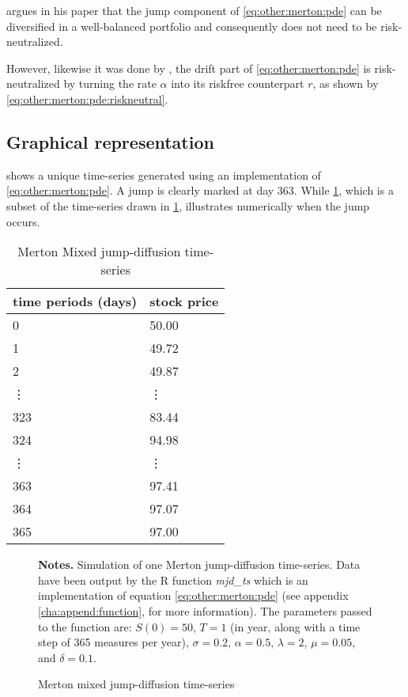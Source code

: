 \documentclass[12pt,a4paper]{report}
\begin{document}
\citet{merton76} argues in his paper that the jump component of \cref{eq:other:merton:pde} can be diversified in a well-balanced portfolio and consequently does not need to be risk-neutralized.

However, likewise it was done by \citet{bs}, the drift part of \cref{eq:other:merton:pde} is risk-neutralized by turning the rate $\alpha$ into its riskfree counterpart $r$, as shown by \cref{eq:other:merton:pde:riskneutral}.



\subsection{Graphical representation}
\label{sub:other:merton:graphical}   

 shows a unique time-series generated using an implementation of \cref{eq:other:merton:pde}. A jump is clearly marked at day 363. While
\cref{t:other:merton:path}, which is a subset of the time-series drawn in \cref{p:other:merton:path}, illustrates numerically when the jump occurs.

\begin{table}[ht]
\centering
\begin{tabular}{ll}
  \hline
 time periods (days)& stock price\\ 
  \hline
  0   &50.00 \\ 
  1   &49.72 \\ 
  2   &49.87 \\ 
  \vdots & \vdots \\
  323 &83.44 \\ 
  324 &94.98 \\ 
  \vdots & \vdots \\
  363 &97.41 \\ 
  364 &97.07 \\ 
  365 &97.00 \\ 
   \hline
\end{tabular}
\caption{Merton Mixed jump-diffusion time-series}
\label{t:other:merton:path}
\end{table}

\begin{figure}[ht]
  \centering
   
  \begin{changemargin}{0.5cm}{0.5cm}
  \medskip
\footnotesize
{}\textbf{Notes.} Simulation of one Merton jump-diffusion time-series. Data have been output by the R function \textit{mjd\_ts} which is an implementation of equation \cref{eq:other:merton:pde} (see appendix \ref{cha:append:function}, for more information). The parameters passed to the function are:  $S(0) = 50$,   $T = 1$ (in year, along with a time step of 365 measures per year),  $\sigma = 0.2$, $\alpha = 0.5$,  $\lambda = 2$,  $\mu = 0.05$, and $\delta = 0.1$.   
\end{changemargin}
  \caption{Merton mixed jump-diffusion time-series}
  \label{p:other:merton:path}
\end{figure}
\end{document}
